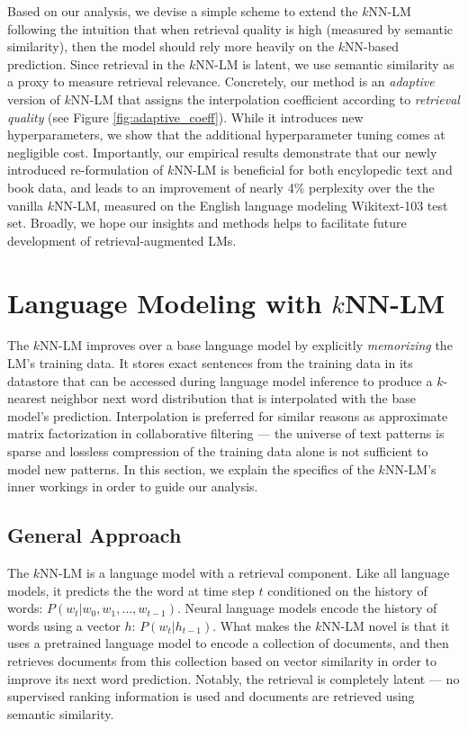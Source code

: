 \documentclass[11pt]{article}
\begin{document}
Based on our analysis, we devise a simple scheme to extend the $k$NN-LM following the intuition that when retrieval quality is high (measured by semantic similarity), then the model should rely more heavily on the $k$NN-based prediction. Since retrieval in the $k$NN-LM is latent, we use semantic similarity as a proxy to measure retrieval relevance. Concretely, our method is an \textit{adaptive} version of $k$NN-LM that assigns the interpolation coefficient according to \textit{retrieval quality} (see Figure \ref{fig:adaptive_coeff}). While it introduces new hyperparameters,  we show that the additional hyperparameter tuning comes at negligible cost. Importantly, our empirical results demonstrate that our newly introduced re-formulation of $k$NN-LM is beneficial for both encylopedic text and book data, and leads to an improvement of nearly 4\% perplexity over the the vanilla $k$NN-LM, measured on the English language modeling Wikitext-103 test set. Broadly, we hope our insights and methods helps to facilitate future development of retrieval-augmented LMs.

\section{Language Modeling with $k$NN-LM}

The $k$NN-LM improves over a base language model by explicitly \textit{memorizing} the LM's training data. It stores exact sentences from the training data in its datastore that can be accessed during language model inference to produce a $k$-nearest neighbor next word distribution that is interpolated with the base model's prediction. Interpolation is preferred for similar reasons as approximate matrix factorization in collaborative filtering --- the universe of text patterns is sparse and lossless compression of the training data alone is not sufficient to model new patterns. In this section, we explain the specifics of the $k$NN-LM's inner workings in order to guide our analysis.

\subsection{General Approach}
\label{sec:knnlm_approach}

The $k$NN-LM \cite{khandelwal20generalization} is a language model with a retrieval component. Like all language models, it predicts the the word at time step $t$ conditioned on the history of words: $P(w_t | w_{0}, w_{1}, \dots, w_{t-1})$. Neural language models encode the history of words using a vector $h$: $P(w_t | h_{t-1})$. What makes the $k$NN-LM novel is that it uses a pretrained language model to encode a collection of documents, and then retrieves documents from this collection based on vector similarity in order to improve its next word prediction. Notably, the retrieval is completely latent --- no supervised ranking information is used and  documents are  retrieved using semantic similarity.
\end{document}

